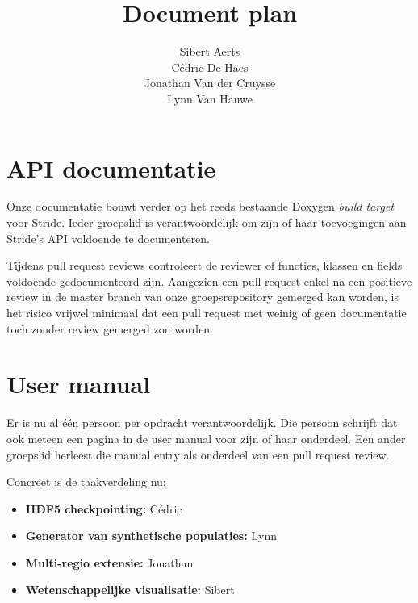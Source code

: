 \documentclass[12pt,a4paper]{article}
\author{Sibert Aerts \\ Cédric De Haes \\ Jonathan Van der Cruysse \\ Lynn Van Hauwe}
\title{Document plan}
\begin{document}
	
	\newcommand{\titleitem}[1]{\item \textbf{#1}}

	\maketitle
	
	\section{API documentatie}
	
	Onze documentatie bouwt verder op het reeds bestaande Doxygen \emph{build target} voor Stride. Ieder groepslid is verantwoordelijk om zijn of haar toevoegingen aan Stride's API voldoende te documenteren.
	
	Tijdens pull request reviews controleert de reviewer of functies, klassen en fields voldoende gedocumenteerd zijn. Aangezien een pull request enkel na een positieve review in de master branch van onze groepsrepository gemerged kan worden, is het risico vrijwel minimaal dat een pull request met weinig of geen documentatie toch zonder review gemerged zou worden.
	
	\section{User manual}
	
	Er is nu al \'e\'en persoon per opdracht verantwoordelijk. Die persoon schrijft dat ook meteen een pagina in de user manual voor zijn of haar onderdeel. Een ander groepslid herleest die manual entry als onderdeel van een pull request review.
	
	Concreet is de taakverdeling nu:
	
	\begin{itemize}
		\titleitem{HDF5 checkpointing:} Cédric
		\titleitem{Generator van synthetische populaties:} Lynn
		\titleitem{Multi-regio extensie:} Jonathan
		\titleitem{Wetenschappelijke visualisatie:} Sibert
	\end{itemize}
\end{document}
